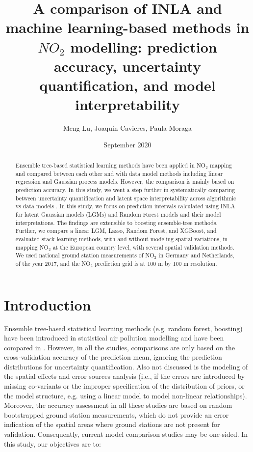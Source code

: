 \documentclass{article}
\author{Meng Lu, Joaquin Cavieres, Paula Moraga }
\date{September 2020}
\title{A comparison of INLA and machine learning-based methods in $NO_2$ modelling: prediction accuracy, uncertainty quantification, and model interpretability }
\begin{document}
\maketitle
\begin{abstract} 
Ensemble tree-based statistical learning methods have been applied in NO$_2$ mapping and compared between each other and with data model methods including linear regression and Gaussian process models. However, the comparison is mainly based on prediction accuracy. In this study, we went a step further in systematically comparing between uncertainty quantification and latent space interpretability across algorithmic vs data models \citep{breiman2001statistical}. In this study, we focus on prediction intervals calculated using INLA \citep{blangiardo2015spatial} for latent Gaussian models (LGMs) and Random Forest models and their model interpretations. The findings are extensible to boosting ensemble-tree methods. Further, we compare a linear LGM, Lasso, Random Forest, and XGBoost, and evaluated stack learning methods, with and without modeling spatial variations, in mapping NO$_2$ at the European country level, with several spatial validation methods. We used national ground station measurements of NO$_2$ in Germany and Netherlands, of the year 2017, and the NO$_2$ prediction grid is at 100 m by 100 m resolution.  
\end{abstract}

\section{Introduction}
Ensemble tree-based statistical learning methods (e.g. random forest, boosting) have been introduced in statistical air pollution modelling and have been compared in \cite{chen2019comparison,kerckhoffs2019performance,luglobal}. However, in all the studies, comparisons are only based on the cross-validation accuracy of the prediction mean, ignoring the prediction distributions for uncertainty quantification. Also not discussed is the modeling of the spatial effects and error sources analysis (i.e., if the errors are introduced by missing co-variants or the improper specification of the distribution of priors, or the model structure, e.g. using a linear model to model non-linear relationships). Moreover, the accuracy assessment in all these studies are based on random bootstrapped ground station measurements, which do not provide an error indication of the spatial areas where ground stations are not present for validation. Consequently, current model comparison studies may be one-sided. In this study, our objectives are to:
\end{document}
